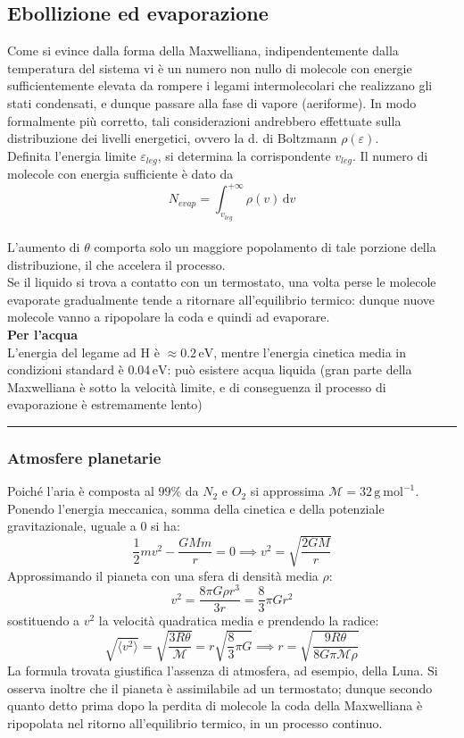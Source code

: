 \documentclass[10pt, oneside]{book}
\newcommand{\evolt}{\, \mathrm{eV}}
\newcommand{\molms}{\mathcal{M}}
\newcommand{\grams}[1]{\, \mathrm{g^{#1}}}
\newcommand{\mols}[1]{\, \mathrm{mol^{#1}}}
\newcommand{\mean}[1]{\langle #1 \rangle}
\newcommand{\infobox}[2]{\vspace{0.5cm}~\\ \textbf{#1} \hrulefill \vspace{0.2cm}\\#2 \\\hrule \vspace{0.5cm}}
\newcommand{\ds}{\displaystyle}
\newcommand{\integral}[4]{\int_{#1}^{#2} #3 \, \mathrm{d}#4}
\begin{document}
\subsection{Ebollizione ed evaporazione}
Come si evince dalla forma della Maxwelliana, indipendentemente dalla temperatura del sistema vi è un numero non nullo di molecole con energie sufficientemente elevata da rompere i legami intermolecolari che realizzano gli stati condensati, e dunque passare alla fase di vapore (aeriforme). In modo formalmente più corretto, tali considerazioni andrebbero effettuate sulla distribuzione dei livelli energetici, ovvero la d. di Boltzmann $\rho (\varepsilon)$.
\\Definita l'energia limite $\varepsilon_{leg}$, si determina la corrispondente $v_{leg}$. Il numero di molecole con energia sufficiente è dato da
\[N_{evap} = \integral{v_{leg}}{+\infty}{\rho(v)}{v}\]
\\L'aumento di $\theta$ comporta solo un maggiore popolamento di tale porzione della distribuzione, il che accelera il processo.
\\Se il liquido si trova a contatto con un termostato, una volta perse le molecole evaporate gradualmente tende a ritornare all'equilibrio termico: dunque nuove molecole vanno a ripopolare la coda e quindi ad evaporare.
\infobox{Per l'acqua}{L'energia del legame ad H è $\ds \approx 0.2 \evolt$, mentre l'energia cinetica media in condizioni standard è $0.04 \evolt$: può esistere acqua liquida (gran parte della Maxwelliana è sotto la velocità limite, e di conseguenza il processo di evaporazione è estremamente lento)}

\subsubsection{Atmosfere planetarie}
Poiché l'aria è composta al $99 \%$ da $N_2$ e $O_2$ si approssima $\mathcal{M} = 32 \grams{} \mols{-1}$. Ponendo l'energia meccanica, somma della cinetica e della potenziale gravitazionale, uguale a $0$ si ha:
\[\frac{1}{2} m v^2 - \frac{GM m}{r} = 0 \implies v^2 = \sqrt{\frac{2G M}{r}}\]
Approssimando il pianeta con una sfera di densità media $\rho$:
\[v^2 = \frac{8 \pi G \rho r^3}{3 r} = \frac{8}{3} \pi G r^2\]
sostituendo a $v^2$ la velocità quadratica media e prendendo la radice:
\[\sqrt{\mean{v^2}} = \sqrt{\frac{3 R \theta}{\molms}} = r \sqrt{\frac{8}{3} \pi G} \implies r = \sqrt{\frac{9 R \theta}{8 G \pi \molms \rho}}\]
La formula trovata giustifica l'assenza di atmosfera, ad esempio, della Luna. Si osserva inoltre che il pianeta è assimilabile ad un termostato; dunque secondo quanto detto prima dopo la perdita di molecole la coda della Maxwelliana è ripopolata nel ritorno all'equilibrio termico, in un processo continuo.
\end{document}
